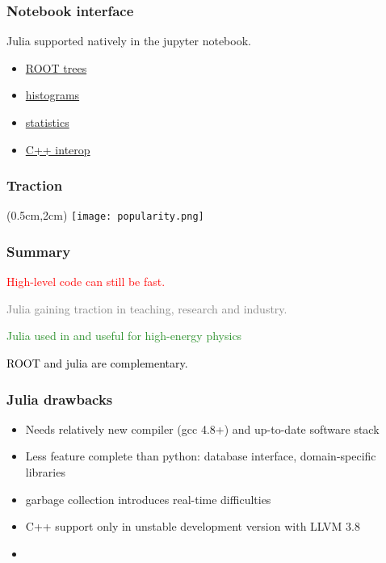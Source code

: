 \documentclass[16pt]{beamer}
\begin{document}
\begin{frame}[fragile]
  \frametitle{Notebook interface}
  Julia supported natively in the jupyter notebook.
  
  \begin{itemize}
    \item{\href{https://github.com/jpata/JuliaForPhysicists/blob/master/tabular.ipynb}{ROOT trees}}
    \item{\href{https://github.com/jpata/JuliaForPhysicists/blob/master/Stats.ipynb}{histograms}}
    \item{\href{https://github.com/jpata/JuliaForPhysicists/blob/master/Histograms.ipynb}{statistics}}
    \item{\href{https://github.com/jpata/JuliaForPhysicists/blob/master/Cxx.ipynb}{C++ interop}}
  \end{itemize}
\end{frame}

\begin{frame}[fragile]
  \frametitle{Traction}
  \begin{textblock*}{5cm}(0.5cm,2cm) %
    \texttt{[image: popularity.png]}
  \end{textblock*}
\end{frame}

\begin{frame}
  \frametitle{Summary}
  \begin{center}
  \Large \textcolor{red}{High-level code can still be fast.}
  \end{center}

  \begin{center}
  \Large \textcolor{gray}{Julia gaining traction in teaching, research and industry.}
  \end{center}

  \begin{center}
  \Large \textcolor{ForestGreen}{Julia used in and useful for high-energy physics}
  \end{center}

  \begin{center}
  \Large \textcolor{black}{ROOT and julia are complementary.}
  \end{center}

\end{frame}

\begin{frame}[fragile]
  \frametitle{Julia drawbacks}
  \begin{itemize}
    \item Needs relatively new compiler (gcc 4.8+) and up-to-date software stack
    \item Less feature complete than python: database interface, domain-specific libraries
    \item garbage collection introduces real-time difficulties
    \item C++ support only in unstable development version with LLVM 3.8
    \item 
  \end{itemize}
\end{frame}
\end{document}
